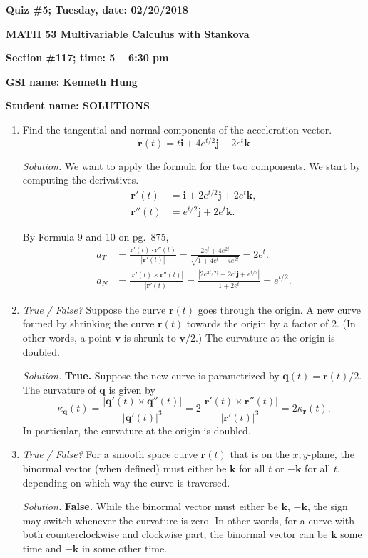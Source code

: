 \documentclass{article}
\newcommand{\qq}{\mathbf{q}}
\newcommand{\rr}{\mathbf{r}}
\newcommand{\ii}{\mathbf{i}}
\newcommand{\jj}{\mathbf{j}}
\newcommand{\kk}{\mathbf{k}}
\begin{document}
{\bf Quiz \#5; Tuesday, date: 02/20/2018}

{\bf MATH 53 Multivariable Calculus with Stankova}

{\bf Section \#117; time: 5 -- 6:30 pm}

{\bf GSI name: Kenneth Hung}

{\bf Student name: SOLUTIONS}

\vspace*{0.25in}

\begin{enumerate}
\item Find the tangential and normal components of the acceleration vector.
\[
\rr(t) = t \ii + 4e^{t/2} \jj + 2e^t \kk
\]

{\em Solution.} We want to apply the formula for the two components. We start by computing the derivatives.
\begin{align*}
\rr'(t) & = \ii + 2e^{t/2} \jj + 2e^t \kk, \\
\rr''(t) & = e^{t/2} \jj + 2e^t \kk.
\end{align*}

By Formula 9 and 10 on pg.\ 875,
\begin{align*}
a_T & = \frac{\rr'(t) \cdot \rr''(t)}{|\rr'(t)|} = \frac{2e^t + 4e^{2t}}{\sqrt{1 + 4e^t + 4e^{2t}}} = 2e^t. \\
a_N & = \frac{|\rr'(t) \times \rr''(t)|}{|\rr'(t)|} = \frac{|2e^{3t/2} \ii - 2e^t \jj + e^{t/2}|}{1 + 2e^t} = e^{t/2}.
\end{align*}

\item {\em True / False?} Suppose the curve $\rr(t)$ goes through the origin. A new curve formed by shrinking the curve $\rr(t)$ towards the origin by a factor of $2$. (In other words, a point $\mathbf{v}$ is shrunk to $\mathbf{v} / 2$.) The curvature at the origin is doubled.

{\em Solution.} {\bf True.} Suppose the new curve is parametrized by $\qq(t) = \rr(t) / 2$. The curvature of $\qq$ is given by
\[
\kappa_{\qq}(t) = \frac{|\qq'(t) \times \qq''(t)|}{|\qq'(t)|^3} = 2 \frac{|\rr'(t) \times \rr''(t)|}{|\rr'(t)|^3} = 2 \kappa_{\rr}(t).
\]
In particular, the curvature at the origin is doubled.

\item {\em True / False?} For a smooth space curve $\rr(t)$ that is on the $x, y$-plane, the binormal vector (when defined) must either be $\kk$ for all $t$ or $-\kk$ for all $t$, depending on which way the curve is traversed.

{\em Solution.} {\bf False.} While the binormal vector must either be $\kk$, $-\kk$, the sign may switch whenever the curvature is zero. In other words, for a curve with both counterclockwise and clockwise part, the binormal vector can be $\kk$ some time and $-\kk$ in some other time.
\end{enumerate}
\end{document}
